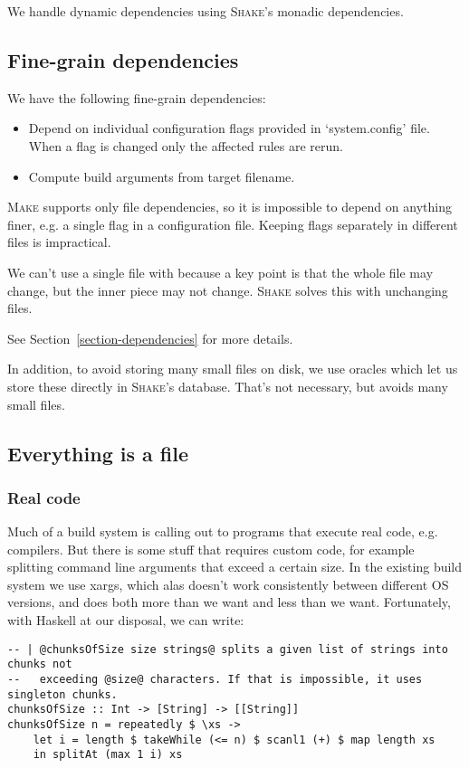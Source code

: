 We handle dynamic dependencies using \textsc{Shake}'s monadic dependencies.

\subsection{Fine-grain dependencies}

We have the following fine-grain dependencies:
\begin{itemize}
  \item Depend on individual configuration flags provided in `system.config'
  file. When a flag is changed only the affected rules are rerun.
  \item Compute build arguments from target filename.
\end{itemize}

\textsc{Make} supports only file dependencies, so it is impossible to depend
on anything finer, e.g. a single flag in a configuration file. Keeping flags
separately in different files is impractical.

We can't use a single file with \make{} because a key point is that the whole file
may change, but the inner piece may not change. \textsc{Shake} solves this with
unchanging files.

See Section~\ref{section-dependencies} for more details.

In addition, to avoid storing many small files on disk, we use oracles which let
us store these directly in \textsc{Shake}'s database. That's not necessary, but
avoids many small files.

\subsection{Everything is a file}


\subsubsection{Real code}

Much of a build system is calling out to programs that execute real code, e.g. compilers. But there is some stuff that requires custom code, for example splitting command line arguments that exceed a certain size. In the existing build system we use xargs, which alas doesn't work consistently between different OS versions, and does both more than we want and less than we want. Fortunately, with Haskell at our disposal, we can write:

\begin{lstlisting}
-- | @chunksOfSize size strings@ splits a given list of strings into chunks not
--   exceeding @size@ characters. If that is impossible, it uses singleton chunks.
chunksOfSize :: Int -> [String] -> [[String]]
chunksOfSize n = repeatedly $ \xs ->
    let i = length $ takeWhile (<= n) $ scanl1 (+) $ map length xs
    in splitAt (max 1 i) xs
\end{lstlisting}

